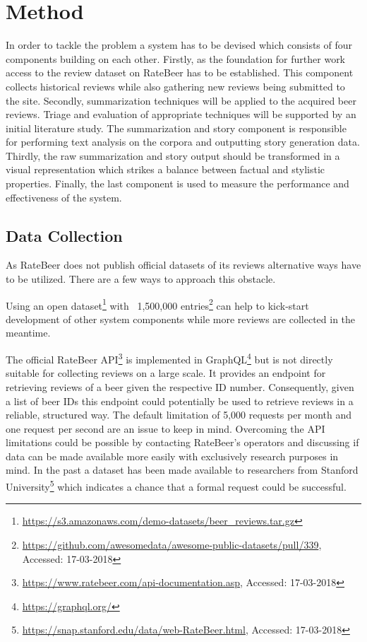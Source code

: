 \section{Method}
In order to tackle the problem a system has to be devised which consists of four components building on each other.
Firstly, as the foundation for further work access to the review dataset on RateBeer has to be established.
This component collects historical reviews while also gathering new reviews being submitted to the site.
Secondly, summarization techniques will be applied to the acquired beer reviews.
Triage and evaluation of appropriate techniques will be supported by an initial literature study.
The summarization and story component is responsible for performing text analysis on the corpora and outputting story generation data.
Thirdly, the raw summarization and story output should be transformed in a visual representation which strikes a balance between factual and stylistic properties.
Finally, the last component is used to measure the performance and effectiveness of the system.

\subsection{Data Collection}
As RateBeer does not publish official datasets of its reviews alternative ways have to be utilized.
There are a few ways to approach this obstacle.

Using an open dataset\footnote{\url{https://s3.amazonaws.com/demo-datasets/beer_reviews.tar.gz}} with ~1,500,000 entries\footnote{\url{https://github.com/awesomedata/awesome-public-datasets/pull/339}, Accessed: 17-03-2018} can help to kick-start development of other system components while more reviews are collected in the meantime.

The official RateBeer API\footnote{\url{https://www.ratebeer.com/api-documentation.asp}, Accessed: 17-03-2018} is implemented in GraphQL\footnote{\url{https://graphql.org/}} but is not directly suitable for collecting reviews on a large scale.
It provides an endpoint for retrieving reviews of a beer given the respective ID number.
Consequently, given a list of beer IDs this endpoint could potentially be used to retrieve reviews in a reliable, structured way.
The default limitation of 5,000 requests per month and one request per second are an issue to keep in mind.
Overcoming the API limitations could be possible by contacting RateBeer's operators and discussing if data can be made available more easily with exclusively research purposes in mind.
In the past a dataset has been made available to researchers from Stanford University\footnote{\url{https://snap.stanford.edu/data/web-RateBeer.html}, Accessed: 17-03-2018} which indicates a chance that a formal request could be successful.

